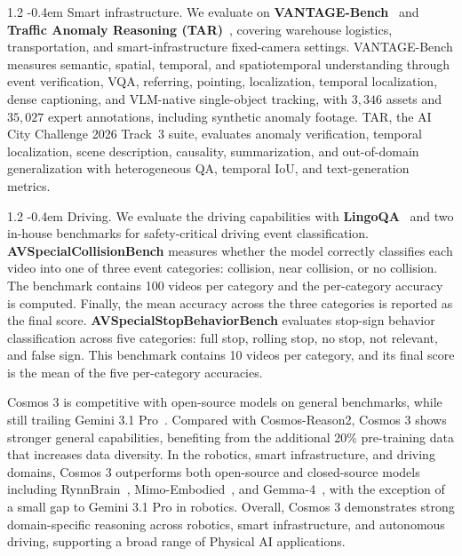 \documentclass{llmxive}
\makeatletter
\providecommand{\paragraph}{  \@startsection{paragraph}{4}{\z@}    {1\baselineskip \@plus .2\baselineskip}    {-0.4em}    {\normalfont\normalsize\bfseries}}
\makeatother
\begin{document}
\paragraph{Smart infrastructure.} We evaluate on \textbf{VANTAGE-Bench}~\citep{nvidia2026vantage} and \textbf{Traffic Anomaly Reasoning (TAR)}~\citep{nvidia2026tar}, covering warehouse logistics, transportation, and smart-infrastructure fixed-camera settings. VANTAGE-Bench measures semantic, spatial, temporal, and spatiotemporal understanding through event verification, VQA, referring, pointing, localization, temporal localization, dense captioning, and VLM-native single-object tracking, with $3{,}346$ assets and $35{,}027$ expert annotations, including synthetic anomaly footage. TAR, the AI City Challenge 2026 Track~3 suite, evaluates anomaly verification, temporal localization, scene description, causality, summarization, and out-of-domain generalization with heterogeneous QA, temporal IoU, and text-generation metrics.

\paragraph{Driving.} We evaluate the driving capabilities with \textbf{LingoQA}~\citep{marcu2024lingoqa} and two in-house benchmarks for safety-critical driving event classification. \textbf{AVSpecialCollisionBench} measures whether the model correctly classifies each video into one of three event categories: collision, near collision, or no collision. The benchmark contains 100 videos per category and the per-category accuracy is computed. Finally, the mean accuracy across the three categories is reported as the final score. \textbf{AVSpecialStopBehaviorBench} evaluates stop-sign behavior classification across five categories: full stop, rolling stop, no stop, not relevant, and false sign. This benchmark contains 10 videos per category, and its final score is the mean of the five per-category accuracies.

Cosmos 3 is competitive with open-source models on general benchmarks, while still trailing Gemini 3.1 Pro~\citep{gemini3}. Compared with Cosmos-Reason2, Cosmos 3 shows stronger general capabilities, benefiting from the additional 20\% pre-training data that increases data diversity. In the robotics, smart infrastructure, and driving domains, Cosmos 3 outperforms both open-source and closed-source models including RynnBrain~\citep{dang2026rynnbrain}, Mimo-Embodied~\citep{hao2025mimo}, and Gemma-4~\citep{gemma4modelcard}, with the exception of a small gap to Gemini 3.1 Pro in robotics. Overall, Cosmos 3 demonstrates strong domain-specific reasoning across robotics, smart infrastructure, and autonomous driving, supporting a broad range of Physical AI applications.
\end{document}
